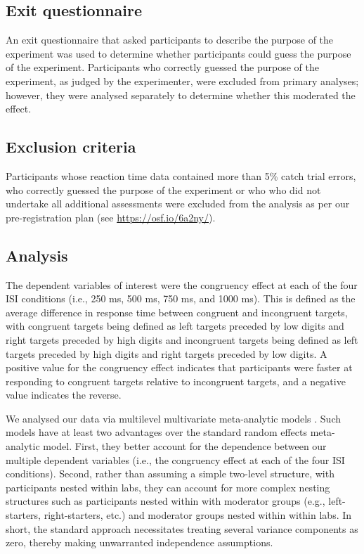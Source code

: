 \documentclass[A4paper,man,floatsintext]{apa6}
\theoremstyle{definition}
\theoremstyle{definition}
\theoremstyle{definition}
\theoremstyle{remark}
\begin{document}
\subsection{Exit questionnaire}\label{exit-questionnaire}

An exit questionnaire that asked participants to describe the purpose of
the experiment was used to determine whether participants could guess
the purpose of the experiment. Participants who correctly guessed the
purpose of the experiment, as judged by the experimenter, were excluded
from primary analyses; however, they were analysed separately to
determine whether this moderated the effect.

\subsection{Exclusion criteria}\label{exclusion-criteria}

Participants whose reaction time data contained more than 5\% catch
trial errors, who correctly guessed the purpose of the experiment or who
who did not undertake all additional assessments were excluded from the
analysis as per our pre-registration plan (see
\url{https://osf.io/6a2ny/}).

\subsection{Analysis}\label{analysis}

The dependent variables of interest were the congruency effect at each
of the four ISI conditions (i.e., 250 ms, 500 ms, 750 ms, and 1000 ms).
This is defined as the average difference in response time between
congruent and incongruent targets, with congruent targets being defined
as left targets preceded by low digits and right targets preceded by
high digits and incongruent targets being defined as left targets
preceded by high digits and right targets preceded by low digits. A
positive value for the congruency effect indicates that participants
were faster at responding to congruent targets relative to incongruent
targets, and a negative value indicates the reverse.

We analysed our data via multilevel multivariate meta-analytic models
\autocite{McSBoc18}. Such models have at least two advantages over the
standard random effects meta-analytic model. First, they better account
for the dependence between our multiple dependent variables (i.e., the
congruency effect at each of the four ISI conditions). Second, rather
than assuming a simple two-level structure, with participants nested
within labs, they can account for more complex nesting structures such
as participants nested within with moderator groups (e.g.,
left-starters, right-starters, etc.) and moderator groups nested within
within labs. In short, the standard approach necessitates treating
several variance components as zero, thereby making unwarranted
independence assumptions.
\end{document}
